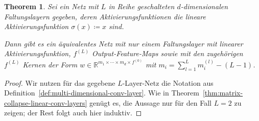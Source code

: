\documentclass[paper=a4, 	%
		fontsize=11pt,
		abstract=true, 	%
		headsepline, 	%
		notitlepage	%
		]{scrartcl}
\newtheorem{theorem}{Theorem}[section]
\theoremstyle{definition}
\newcommand{\R}{\mathbb{R}}
\begin{document}
\begin{theorem}
    Sei ein Netz mit $L$ in Reihe geschalteten $d$-dimensionalen Faltungslayern gegeben, deren Aktivierungsfunktionen die lineare Aktivierungsfunktion $\sigma(x) \coloneqq x$ sind.

    Dann gibt es ein äquivalentes Netz mit nur einem Faltungslayer mit linearer Aktivierungsfunktion, $f^{(L)}$ Output-Feature-Maps sowie mit den zugehörigen $f^{(L)}$ Kernen der Form $w\in\R^{m_1\times\cdots\times m_d \times f^{(0)}}$ mit $m_i=\sum_{l=1}^L m^{(l)}_i - (L-1)$.
\end{theorem}
\begin{proof}
    Wir nutzen für das gegebene $L$-Layer-Netz die Notation aus Definition~\ref{def:multi-dimensional-conv-layer}.
    Wie in Theorem~\ref{thm:matrix-collapse-linear-conv-layers} genügt es, die Aussage nur für den Fall $L=2$ zu zeigen; der Rest folgt auch hier induktiv.


\end{proof}
\end{document}
